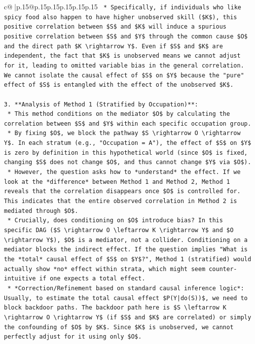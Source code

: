 \documentclass{article}
\begin{document}
{\begin{supertabular}{c@{$\;$}|p{.15\linewidth}@{}p{.15\linewidth}p{.15\linewidth}p{.15\linewidth}p{.15\linewidth}p{.15\linewidth}}
{{{\texttt{    *   Specifically, if individuals who like spicy food also happen to have higher unobserved skill (\$K\$), this positive correlation between \$S\$ and \$K\$ will induce a spurious positive correlation between \$S\$ and \$Y\$ through the common cause \$O\$ and the direct path \$K \textbackslash{}rightarrow Y\$. Even if \$S\$ and \$K\$ are independent, the fact that \$K\$ is unobserved means we cannot adjust for it, leading to omitted variable bias in the general correlation. We cannot isolate the causal effect of \$S\$ on \$Y\$ because the "pure" effect of \$S\$ is entangled with the effect of the unobserved \$K\$.} \\
\\ 
\texttt{3.  **Analysis of Method 1 (Stratified by Occupation)**:} \\
\texttt{    *   This method conditions on the mediator \$O\$ by calculating the correlation between \$S\$ and \$Y\$ within each specific occupation group.} \\
\texttt{    *   By fixing \$O\$, we block the pathway \$S \textbackslash{}rightarrow O \textbackslash{}rightarrow Y\$. In each stratum (e.g., "Occupation = A"), the effect of \$S\$ on \$Y\$ is zero by definition in this hypothetical world (since \$O\$ is fixed, changing \$S\$ does not change \$O\$, and thus cannot change \$Y\$ via \$O\$).} \\
\texttt{    *   However, the question asks how to *understand* the effect. If we look at the *difference* between Method 1 and Method 2, Method 1 reveals that the correlation disappears once \$O\$ is controlled for. This indicates that the entire observed correlation in Method 2 is mediated through \$O\$.} \\
\texttt{    *   Crucially, does conditioning on \$O\$ introduce bias? In this specific DAG (\$S \textbackslash{}rightarrow O \textbackslash{}leftarrow K \textbackslash{}rightarrow Y\$ and \$O \textbackslash{}rightarrow Y\$), \$O\$ is a mediator, not a collider. Conditioning on a mediator blocks the indirect effect. If the question implies "What is the *total* causal effect of \$S\$ on \$Y\$?", Method 1 (stratified) would actually show *no* effect within strata, which might seem counter{-}intuitive if one expects a total effect.} \\
\texttt{    *   *Correction/Refinement based on standard causal inference logic*: Usually, to estimate the total causal effect \$P(Y|do(S))\$, we need to block backdoor paths. The backdoor path here is \$S \textbackslash{}leftarrow K \textbackslash{}rightarrow O \textbackslash{}rightarrow Y\$ (if \$S\$ and \$K\$ are correlated) or simply the confounding of \$O\$ by \$K\$. Since \$K\$ is unobserved, we cannot perfectly adjust for it using only \$O\$.} \\
}}}
\end{supertabular}}
\end{document}

